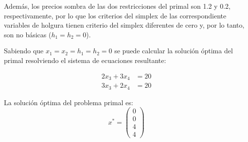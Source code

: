 Además, los precios sombra de las dos restricciones del primal son 1.2 y 0.2, respectivamente, por lo que los criterios del simplex de las correspondiente variables de holgura tienen criterio del simplex diferentes de cero y, por lo tanto, son no básicas ($h_1=h_2=0$).

Sabiendo que $ x_1 = x_2 = h_1 = h_2 = 0 $ se puede calcular la solución óptima del primal resolviendo el sistema de ecuaciones resultante:

\[
\begin{aligned}
2x_3 + 3x_4 &= 20 \\
3x_3 + 2x_4 &= 20
\end{aligned}
\]

La solución óptima del problema primal es: 
\[
x^* = \begin{pmatrix} 0 \\ 0 \\ 4 \\ 4 \end{pmatrix}
\]